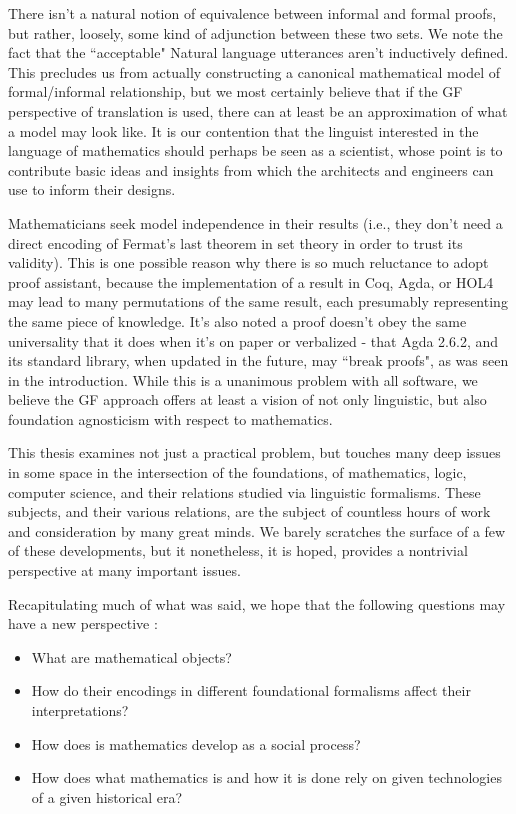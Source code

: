 There isn't a natural notion of equivalence between informal and formal proofs,
but rather, loosely, some kind of adjunction between these two sets. We note the
fact that the ``acceptable" Natural language utterances aren't inductively
defined. This precludes us from actually constructing a canonical mathematical
model of formal/informal relationship, but we most certainly believe that if the
GF perspective of translation is used, there can at least be an approximation of
what a model may look like. It is our contention that the linguist interested in
the language of mathematics should perhaps be seen as a scientist, whose point
is to contribute basic ideas and insights from which the architects and
engineers can use to inform their designs.


Mathematicians seek model independence in their results (i.e., they don't need a
direct encoding of Fermat's last theorem in set theory in order to trust its
validity). This is one possible reason why there is so much reluctance to adopt
proof assistant, because the implementation of a result in Coq, Agda, or HOL4
may lead to many permutations of the same result, each presumably representing
the same piece of knowledge. It's also noted a proof doesn't obey the same
universality that it does when it's on paper or verbalized - that Agda 2.6.2,
and its standard library, when updated in the future, may ``break proofs", as
was seen in the introduction. While this is a unanimous problem with all
software, we believe the GF approach offers at least a vision of not only
linguistic, but also foundation agnosticism with respect to mathematics.

This thesis examines not just a practical problem, but touches many deep issues
in some space in the intersection of the foundations, of mathematics, logic,
computer science, and their relations studied via linguistic formalisms. These
subjects, and their various relations, are the subject of countless hours of
work and consideration by many great minds. We barely scratches the surface of a
few of these developments, but it nonetheless, it is hoped, provides a
nontrivial perspective at many important issues.

Recapitulating much of what was said, we hope that the following questions may
have a new perspective :

\begin{itemize}[noitemsep]
\item What are mathematical objects?
\item How do their encodings in different foundational formalisms affect their
  interpretations?
\item How does is mathematics develop as a social process?
\item How does what mathematics is and how it is done rely on given technologies
  of a given historical era?
\end{itemize}

